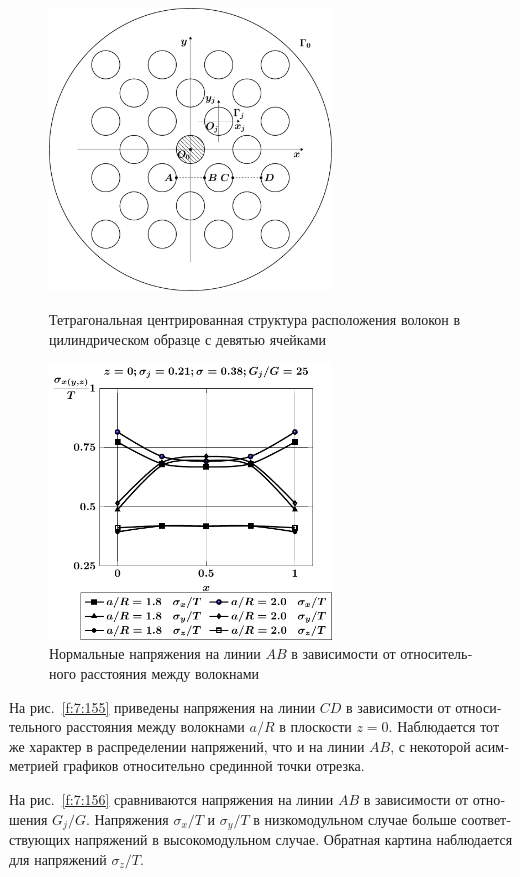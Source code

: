 \begin{russian}
\begin{figure}[h!]
\centering\footnotesize
\parbox[b]{7.5cm}{\centering\includegraphics[width=7.5cm]{inc-25.pdf}
\caption{Тетрагональная центрированная структура расположения волокон в цилиндрическом образце с девятью ячейками
\label{f:7:153}}}\hfil\hfil
\parbox[b]{7.5cm}{\centering\includegraphics[width=7.5cm]{inc25-a-h10-r10-g25-z0-ab.pdf}
\caption{Нормальные напряжения на линии $AB$ в зависимости от относительного расстояния между волокнами 
\label{f:7:154}}}
\end{figure}

На рис.~\ref{f:7:155} приведены напряжения на линии $CD$ в зависимости от относительного расстояния между волокнами $a/R$ в плоскости $z=0$. Наблюдается тот же характер в распределении напряжений, что и на линии $AB$, с некоторой асимметрией графиков относительно срединной точки отрезка.

На рис.~\ref{f:7:156} сравниваются напряжения на линии $AB$ в зависимости от отношения $G_j/G$. Напряжения $\sigma_x/T$ и $\sigma_y/T$ в низкомодульном случае больше соответствующих напряжений в высокомодульном случае. Обратная картина наблюдается для напряжений $\sigma_z/T$.


\end{russian}
